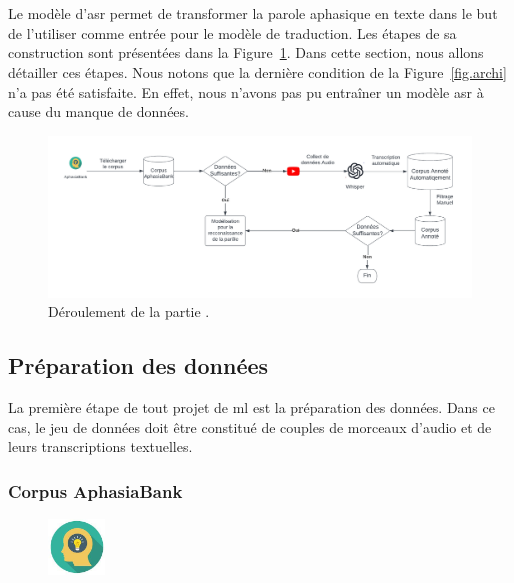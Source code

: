 \section{}

Le modèle d'\gls{asr} permet de transformer la parole aphasique en texte
dans le but de l'utiliser comme entrée pour le modèle de traduction.
Les étapes de sa construction sont présentées dans la Figure~\ref{fig.asr-archi}.
Dans cette section, nous allons détailler ces étapes.
Nous notons que la dernière condition de la Figure~\ref{fig.archi} n'a pas été satisfaite.
En effet, nous n'avons pas pu entraîner un modèle \gls{asr} à cause du manque de données.

\begin{figure}[hbt]
    \begin{center}
        \includegraphics[width=\textwidth]{assets/pdf/ASR.pdf}
    \end{center}
    \caption{Déroulement de la partie .}
    \label{fig.asr-archi}
\end{figure}

\subsection{Préparation des données}

La première étape de tout projet de \gls{ml} est la préparation des données.
Dans ce cas, le jeu de données doit être constitué de couples de morceaux d'audio et de leurs transcriptions textuelles.

\subsubsection{Corpus AphasiaBank}

\begin{figure}
    \includegraphics[width=1.5cm]{assets/images/bank.jpeg}
\end{figure}

